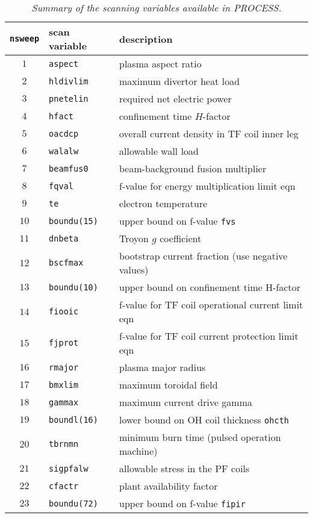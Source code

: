 \documentclass[11pt,a4paper]{report}
\makeatletter
\newcommand{\PSD}{\mbox{\it PROCESS}\@.\/ }
\makeatother
\begin{document}
\begin{table}[tbph]
\begin{center}
\begin{tabular}{||c|l|l||} \hline
{\tt nsweep} & scan variable & description \\ \hline
$1 $ & \tt aspect     & plasma aspect ratio \\
$2 $ & \tt hldivlim   & maximum divertor heat load \\
$3 $ & \tt pnetelin   & required net electric power \\
$4 $ & \tt hfact      & confinement time $H$-factor \\
$5 $ & \tt oacdcp     & overall current density in TF coil inner leg \\
$6 $ & \tt walalw     & allowable wall load \\
$7 $ & \tt beamfus0   & beam-background fusion multiplier \\
$8 $ & \tt fqval      & f-value for energy multiplication limit eqn \\
$9 $ & \tt te         & electron temperature \\
$10$ & \tt boundu(15) & upper bound on f-value {\tt fvs} \\
$11$ & \tt dnbeta     & Troyon $g$ coefficient \\
$12$ & \tt bscfmax    & bootstrap current fraction (use negative values) \\
$13$ & \tt boundu(10) & upper bound on confinement time H-factor \\
$14$ & \tt fiooic     & f-value for TF coil operational current limit eqn \\
$15$ & \tt fjprot     & f-value for TF coil current protection limit eqn \\
$16$ & \tt rmajor     & plasma major radius \\
$17$ & \tt bmxlim     & maximum toroidal field \\
$18$ & \tt gammax     & maximum current drive gamma \\
$19$ & \tt boundl(16) & lower bound on OH coil thickness {\tt ohcth} \\
$20$ & \tt tbrnmn     & minimum burn time (pulsed operation machine) \\
$21$ & \tt sigpfalw   & allowable stress in the PF coils \\
$22$ & \tt cfactr     & plant availability factor \\ 
$23$ & \tt boundu(72) & upper bound on f-value {\tt fipir} \\ \hline
\end{tabular}
\end{center}
\caption[TABLE_SCANS]{{\it
Summary of the scanning variables available in \PSD }}
\label{tab:scans}
\end{table}
\end{document}
